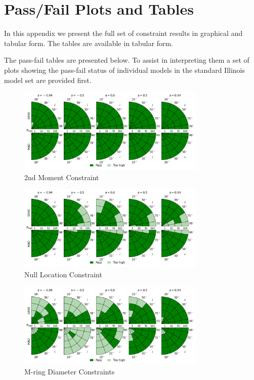 \section{Pass/Fail Plots and Tables}\label{app:tables}


In this appendix we present the full set of constraint results in graphical and tabular form.  The tables are available in tabular form.

The pass-fail tables are presented below.  To assist in interpreting them a set of plots showing the pass-fail status of individual models in the standard Illinois model set are provided first.

\begin{figure}
  \centering
  \includegraphics[width=0.8\textwidth]{./figures/230GHz_size_Constraints.png}
  \caption{2nd Moment Constraint}
  \label{fig:230GHz_size_pizza}
\end{figure}
\begin{figure}
  \centering
  \includegraphics[width=0.8\textwidth]{./figures/Null_loc_Constraints.png}
  \caption{Null Location Constraint}
  \label{fig:null_pizza}
\end{figure}
\begin{figure}
  \centering
  \includegraphics[width=0.8\textwidth]{./figures/Mring_d_Constraints.png}
  \caption{M-ring Diameter Constraints}
  \label{fig:mring_diam_pizza}
\end{figure}
